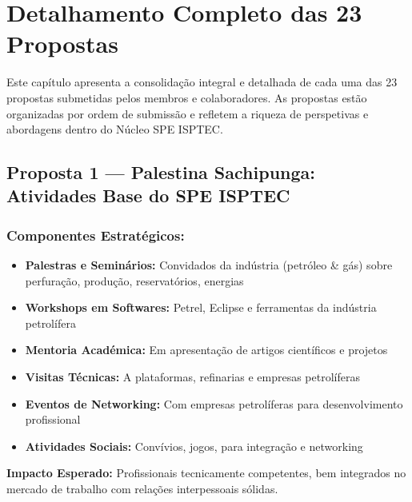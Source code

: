 \documentclass[12pt,a4paper]{article}
\begin{document}
\newpage


\section{Detalhamento Completo das 23 Propostas}

\noindent Este capítulo apresenta a consolidação integral e detalhada de cada uma das 23 propostas submetidas pelos membros e colaboradores. As propostas estão organizadas por ordem de submissão e refletem a riqueza de perspetivas e abordagens dentro do Núcleo SPE ISPTEC.

\subsection{Proposta 1 — Palestina Sachipunga: Atividades Base do SPE ISPTEC}

\subsubsection*{Componentes Estratégicos:}

\begin{itemize}[itemsep=0.2cm]
    \item \textbf{Palestras e Seminários:} Convidados da indústria (petróleo \& gás) sobre perfuração, produção, reservatórios, energias
    
    \item \textbf{Workshops em Softwares:} Petrel, Eclipse e ferramentas da indústria petrolífera
    
    \item \textbf{Mentoria Académica:} Em apresentação de artigos científicos e projetos
    
    \item \textbf{Visitas Técnicas:} A plataformas, refinarias e empresas petrolíferas
    
    \item \textbf{Eventos de Networking:} Com empresas petrolíferas para desenvolvimento profissional
    
    \item \textbf{Atividades Sociais:} Convívios, jogos, para integração e networking
\end{itemize}

\textbf{Impacto Esperado:} Profissionais tecnicamente competentes, bem integrados no mercado de trabalho com relações interpessoais sólidas.
\end{document}
